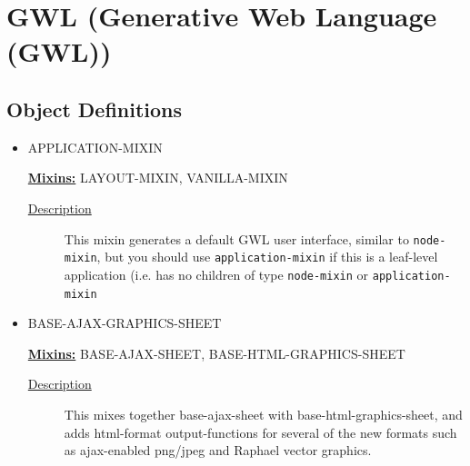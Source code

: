 \documentclass [11pt]{book}
\begin{document}
\section{GWL (Generative Web Language (GWL))}

\label{sec:gwl(generativeweblanguage(gwl))}





\subsection{Object Definitions}

\label{subsec:objectdefinitions}



\begin{itemize}

\item {}APPLICATION-MIXIN


\textbf{
\underline{Mixins:}} LAYOUT-MIXIN, VANILLA-MIXIN





\begin{description}

\item [
\underline{Description}]


This mixin generates a default GWL user interface, similar to \texttt{node-mixin}, but you should use
\texttt{application-mixin} if this is a leaf-level application (i.e. has no children of type \texttt{node-mixin}
or \texttt{application-mixin}



\end{description}









\item {}BASE-AJAX-GRAPHICS-SHEET


\textbf{
\underline{Mixins:}} BASE-AJAX-SHEET, BASE-HTML-GRAPHICS-SHEET





\begin{description}

\item [
\underline{Description}]


This mixes together base-ajax-sheet 
with base-html-graphics-sheet, and adds html-format output-functions 
for several of the new formats such as ajax-enabled png/jpeg and 
Raphael vector graphics.




\end{description}
\end{itemize}
\end{document}
